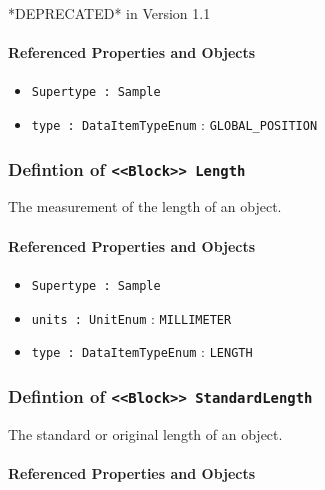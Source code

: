 \FloatBarrier

*DEPRECATED* in Version 1.1

\FloatBarrier
\paragraph{Referenced Properties and Objects}

\begin{itemize}
\item \texttt{Supertype : Sample}

\item \texttt{type : DataItemTypeEnum} : \texttt{GLOBAL_POSITION}

\end{itemize}
\FloatBarrier
\subsubsection{Defintion of \texttt{<<Block>> Length}}
  \label{type:Length}

\FloatBarrier

The measurement of the length of an object.

\FloatBarrier
\paragraph{Referenced Properties and Objects}

\begin{itemize}
\item \texttt{Supertype : Sample}

\item \texttt{units : UnitEnum} : \texttt{MILLIMETER}

\item \texttt{type : DataItemTypeEnum} : \texttt{LENGTH}

\end{itemize}
\FloatBarrier
\subsubsection{Defintion of \texttt{<<Block>> StandardLength}}
  \label{type:StandardLength}

\FloatBarrier

The standard or original length of an object.

\FloatBarrier
\paragraph{Referenced Properties and Objects}

